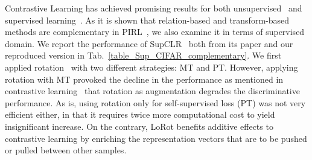 Contrastive Learning has achieved promising results for both unsupervised~\cite{chen2020simple, caron2020unsupervised} and supervised learning~\cite{khosla2020supervised}. 
As it is shown that relation-based and transform-based methods are complementary in PIRL~\cite{misra2020self}, we also examine it in terms of supervised domain. 
We report the performance of SupCLR~\cite{khosla2020supervised} both from its paper and our reproduced version in Tab.~\ref{table_Sup_CIFAR_complementary}. 
We first applied rotation~\cite{gidaris2018unsupervised} with two different strategies: MT and PT.
However, applying rotation with MT provoked the decline in the performance as mentioned in contrastive learning~\cite{chen2020learning} that rotation as augmentation degrades the discriminative performance. 
As is, using rotation only for self-supervised loss (PT) was not very efficient either, in that it requires twice more computational cost to yield insignificant increase.
On the contrary, LoRot benefits additive effects to contrastive learning by enriching the representation vectors that are to be pushed or pulled between other samples.


